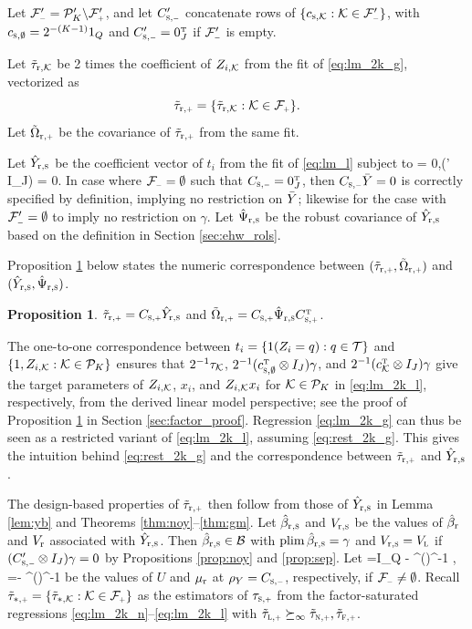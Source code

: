 \documentclass[11pt]{article}
\theoremstyle{definition}
\newtheorem{proposition}{Proposition}
\begin{document}
Let $\mfm' = \pk' \backslash\mfp'$, and let $\csm'$ concatenate rows of $\{\csmk:\mk\in \mfm'\}$, with $c_{{\textsc{s}},\emptyset} = 2^{-(K-1)} 1_Q$ and $\csm' = 0_J^\T$ if $\mfm'$ is empty.


Let $\tilde\tau_{\textup{r},\mathcal{K}}$ be 2 times the coefficient of $Z_{i, \mathcal{K}}$ from the \olss fit of  \eqref{eq:lm_2k_g}, vectorized as $$\ttrp  = \{\ttrmk: \mk\in\mfp\}.$$ 
Let $\torp $ be the \ehws covariance of $\ttrp$ from the same \olss fit. 

Let $\hat Y_{\textup{r},{\textsc{s}}} $ be the coefficient vector of $t_i$ from the \rolss fit of  \eqref{eq:lm_l} subject to 
\beginy\label{eq:rest_2k_g}
\csm \by = 0,\qquad (\csm' \otimes I_J) \gamma = 0. 
\endy 
In case where $\mfm = \emptyset$ such that $\csm = 0_J^\T$, then $\csm \by = 0$ is correctly specified by definition, implying no restriction on $\bar Y$; likewise for the case with $\mfm' = \emptyset$ to imply no restriction on $\gamma$.
Let $\hat\Psi_{\textup{r},{\textsc{s}}}$ be the robust covariance of $\hat Y_{\textup{r},{\textsc{s}}}$ based on the definition in Section \ref{sec:ehw_rols}.


Proposition \ref{prop:2k_g} below states the numeric correspondence between $(\ttrp, \torp )$ and $(\hat Y_{\textup{r},{\textsc{s}}}, \hat\Psi_{\textup{r},{\textsc{s}}})$. 

\begin{proposition}\label{prop:2k_g}
$\ttrp   =  \csp\hyrs$ and $\torp  = \csp\hat\Psi_{\rr,\sss}\csp^\T$. 
\end{proposition}

 The one-to-one correspondence between $t_i = \{ 1(Z_i = q): q\in\mathcal{T}\}$ and $\{1, Z_{i, \mathcal{K}}: \mathcal{K}\in\mathcal P_K\}$ ensures that $2^{-1}\tau_{\mathcal{K}}$, $2^{-1}(c^{ \mathrm{\scriptscriptstyle T} }_{{\textsc{s}},\emptyset} \otimes I_J) \gamma$, and $2^{-1}(c_{\mathcal{K}}^{ \mathrm{\scriptscriptstyle T} }\otimes I_J) \gamma$ give the target parameters of $Z_{i, \mathcal{K}}$, $x_i$, and $Z_{i, \mathcal{K}} x_i$ for $\mathcal{K} \in \mathcal P_K$ in \eqref{eq:lm_2k_l}, respectively, from the derived linear model perspective; see the proof of Proposition \ref{prop:2k_g} in Section \ref{sec:factor_proof}.
Regression \eqref{eq:lm_2k_g} can thus be seen as a restricted variant of \eqref{eq:lm_2k_l}, assuming \eqref{eq:rest_2k_g}.
This gives the intuition behind \eqref{eq:rest_2k_g} and the correspondence between $\ttrp$ and $\hat Y_{\textup{r},{\textsc{s}}}$.

The design-based properties of $\ttrp $  then follow from those of $\hat Y_{\textup{r},{\textsc{s}}}$ in  Lemma \ref{lem:yb} and Theorems \ref{thm:noy}--\ref{thm:gm}. 
Let $\hat\beta_{\textup{r},{\textsc{s}}}$ and $V_{\textup{r},{\textsc{s}}}$ be the values of $\hat\beta_{\textup{r}}$ and $V_{\textup{r}}$ associated with $\hat Y_{\textup{r},{\textsc{s}}}$. 
Then $\hat\beta_{\textup{r},{\textsc{s}}} \in \mathcal{B}$ with $\textup{plim\,} \hat\beta_{\textup{r},{\textsc{s}}} = \gamma$ and $V_{\textup{r},{\textsc{s}}} = V_{\textsc{l}}$ if $(\csm' \otimes I_J) \gamma = 0$ by Propositions \ref{prop:noy} and \ref{prop:sep}.
Let 
\begina
\us =I_Q - \einv \csm^\T   (\csm \einv \csmt)^{-1} \csm, \qquad \murs =- \einv \csm^\T   (\csm \einv \csmt)^{-1} \tsm
\enda
%
%
be the values of $U$ and $\mu_{{\textup{r}} }$ at $\rhy = \csm$, respectively, if $\mfm  \neq \emptyset$.  
Recall $\ttsp = \{\ttsmk: \mk\in\mfp\}$ as the estimators of $\tsp$ from the factor-saturated regressions \eqref{eq:lm_2k_n}--\eqref{eq:lm_2k_l} with $\ttlp \succi \ttnp, \ttfp$. 
\end{document}
